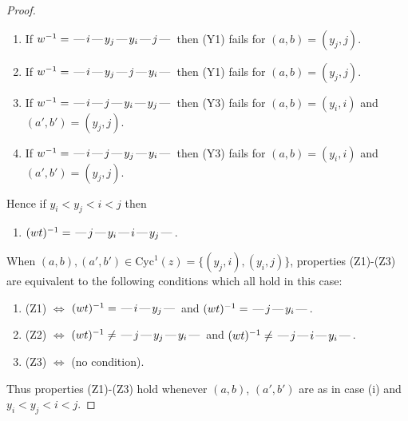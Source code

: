 \documentclass[10pt]{article}
\theoremstyle{definition}
\theoremstyle{definition}
\def\dash{\text{\hspace{0.5mm}---\hspace{0.5mm}}}
\def\Cyc{\mathrm{Cyc}}
\begin{document}
\begin{proof}
\begin{enumerate}
\item If $w^{-1} = \dash i\dash y_j\dash y_i\dash j\dash $ then (Y1) fails for $(a,b)=(y_j,j)$.
\item If $w^{-1} = \dash i\dash y_j\dash j\dash y_i\dash $ then (Y1) fails for $(a,b)=(y_j,j)$.
\item If $w^{-1} = \dash i\dash j\dash y_i\dash y_j\dash $ then (Y3) fails for $(a,b)=(y_i,i)$ and $(a',b')=(y_j,j)$.
\item If $w^{-1} = \dash i\dash j\dash y_j\dash y_i\dash $ then (Y3) fails for $(a,b)=(y_i,i)$ and $(a',b')=(y_j,j)$.
\end{enumerate}
Hence if $y_i < y_j < i < j$ then \begin{enumerate}\item[] $(wt)^{-1} = \dash j\dash y_i\dash i\dash y_j\dash $. \end{enumerate}
When $(a,b),(a',b')\in\Cyc^1(z)= \{(y_j,i),(y_i,j)\}$,
properties (Z1)-(Z3) are equivalent to the following conditions which all hold in this case:
\begin{enumerate}
\item[](Z1) $\Leftrightarrow$ $(wt)^{-1} = \dash i \dash y_j \dash$  and $(wt)^{-1} = \dash j \dash y_i \dash$.
\item[](Z2) $\Leftrightarrow$ $(wt)^{-1} \neq \dash j \dash y_j \dash y_i \dash$ and $(wt)^{-1}\neq \dash j \dash i \dash y_i \dash$.
\item[](Z3) $\Leftrightarrow$ (no condition).
\end{enumerate}
Thus properties (Z1)-(Z3) hold whenever $(a,b)$, $(a',b')$ are as in case (i) and $y_i < y_j < i < j$.

\end{proof}
\end{document}
